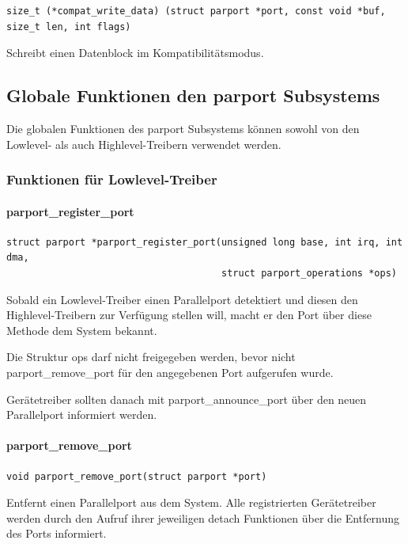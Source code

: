 \documentclass[a4paper,11pt]{article}
\begin{document}
\begin{verbatim}
size_t (*compat_write_data) (struct parport *port, const void *buf, size_t len, int flags)
\end{verbatim}

Schreibt einen Datenblock im Kompatibilitätsmodus.

\subsection{Globale Funktionen den parport Subsystems}

Die globalen Funktionen des parport Subsystems können sowohl von den Lowlevel- als auch
Highlevel-Treibern verwendet werden.

\subsubsection{Funktionen für Lowlevel-Treiber}

\paragraph{parport\_register\_port}
\begin{verbatim}
struct parport *parport_register_port(unsigned long base, int irq, int dma, 
                                      struct parport_operations *ops)
\end{verbatim}

Sobald ein Lowlevel-Treiber einen Parallelport detektiert und diesen den Highlevel-Treibern zur
Verfügung stellen will, macht er den Port über diese Methode dem System bekannt.

Die Struktur ops darf nicht freigegeben werden, bevor nicht parport\_remove\_port für den
angegebenen Port aufgerufen wurde.

Gerätetreiber sollten danach mit parport\_announce\_port über den neuen Parallelport informiert
werden.

\paragraph{parport\_remove\_port}
\begin{verbatim}
void parport_remove_port(struct parport *port)
\end{verbatim}

Entfernt einen Parallelport aus dem System. Alle registrierten Gerätetreiber werden durch den
Aufruf ihrer jeweiligen detach Funktionen über die Entfernung des Ports informiert.
\end{document}
